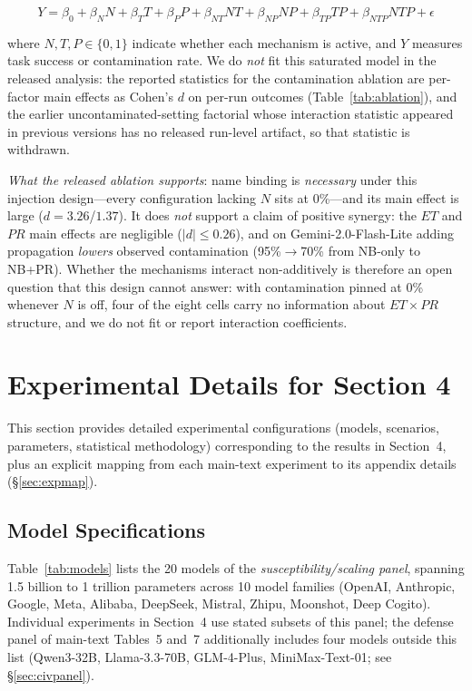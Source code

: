 \documentclass{article}
\theoremstyle{plain}
\theoremstyle{definition}
\begin{document}
\begin{equation}
Y = \beta_0 + \beta_N N + \beta_T T + \beta_P P + \beta_{NT} NT + \beta_{NP} NP + \beta_{TP} TP + \beta_{NTP} NTP + \epsilon
\end{equation}

where $N, T, P \in \{0, 1\}$ indicate whether each mechanism is active, and $Y$ measures task success or contamination rate. We do \emph{not} fit this saturated model in the released analysis: the reported statistics for the contamination ablation are per-factor main effects as Cohen's $d$ on per-run outcomes (Table~\ref{tab:ablation}), and the earlier uncontaminated-setting factorial whose interaction statistic appeared in previous versions has no released run-level artifact, so that statistic is withdrawn.

\textit{What the released ablation supports}: name binding is \emph{necessary} under this injection design---every configuration lacking $N$ sits at 0\%---and its main effect is large ($d=3.26$/$1.37$). It does \emph{not} support a claim of positive synergy: the $ET$ and $PR$ main effects are negligible ($|d| \leq 0.26$), and on Gemini-2.0-Flash-Lite adding propagation \emph{lowers} observed contamination (95\%$\to$70\% from NB-only to NB+PR). Whether the mechanisms interact non-additively is therefore an open question that this design cannot answer: with contamination pinned at 0\% whenever $N$ is off, four of the eight cells carry no information about $ET \times PR$ structure, and we do not fit or report interaction coefficients.

\section{Experimental Details for Section 4}
\label{sec:config}

This section provides detailed experimental configurations (models, scenarios, parameters, statistical methodology) corresponding to the results in Section~4, plus an explicit mapping from each main-text experiment to its appendix details (\S\ref{sec:expmap}).


\subsection{Model Specifications}
\label{sec:modelspec}

Table~\ref{tab:models} lists the 20 models of the \emph{susceptibility/scaling panel}, spanning 1.5 billion to 1 trillion parameters across 10 model families (OpenAI, Anthropic, Google, Meta, Alibaba, DeepSeek, Mistral, Zhipu, Moonshot, Deep Cogito). Individual experiments in Section~4 use stated subsets of this panel; the defense panel of main-text Tables~5 and~7 additionally includes four models outside this list (Qwen3-32B, Llama-3.3-70B, GLM-4-Plus, MiniMax-Text-01; see \S\ref{sec:civpanel}).
\end{document}
